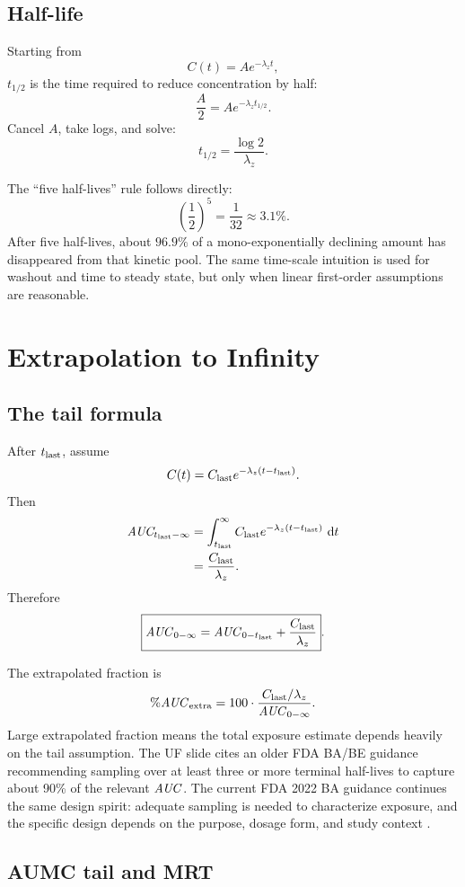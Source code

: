 \documentclass[a4paper]{article}
\newcommand{\AUC}{\ensuremath{\pksym{AUC}}}
\newcommand{\AUClast}{\ensuremath{\pksym{AUC}_{0-t_{\pklab{last}}}}}
\newcommand{\AUCinf}{\ensuremath{\pksym{AUC}_{0-\infty}}}
\newcommand{\Clast}{\ensuremath{C_{\pklab{last}}}}
\newcommand{\Tlast}{\ensuremath{t_{\pklab{last}}}}
\newcommand{\lambdaZ}{\ensuremath{\lambda_z}}
\newcommand{\halfLife}{\ensuremath{t_{1/2}}}
\begin{document}
\subsection{Half-life}

Starting from
\[
  C(t)=Ae^{-\lambdaZ t},
\]
\halfLife{} is the time required to reduce concentration by half:
\[
  \frac{A}{2}=Ae^{-\lambdaZ \halfLife}.
\]
Cancel \(A\), take logs, and solve:
\[
  \halfLife=\frac{\log 2}{\lambdaZ}.
\]

The ``five half-lives'' rule follows directly:
\[
  \left(\frac{1}{2}\right)^5=\frac{1}{32}\approx 3.1\%.
\]
After five half-lives, about \(96.9\%\) of a mono-exponentially declining amount has disappeared from that kinetic pool. The same time-scale intuition is used for washout and time to steady state, but only when linear first-order assumptions are reasonable.

\section{Extrapolation to Infinity}

\subsection{The tail formula}

After \Tlast{}, assume
\[
  C(t)=\Clast e^{-\lambdaZ(t-\Tlast)}.
\]
Then
\[
\begin{aligned}
  \pksym{AUC}_{\Tlast-\infty}
  &=\int_{\Tlast}^{\infty}\Clast e^{-\lambdaZ(t-\Tlast)}\,\dd t\\
  &=\frac{\Clast}{\lambdaZ}.
\end{aligned}
\]
Therefore
\[
  \boxed{
  \AUCinf
  =
  \AUClast+\frac{\Clast}{\lambdaZ}
  }.
\]

The extrapolated fraction is
\[
  \%\pksym{AUC}_{\pklab{extra}}
  =
  100\cdot
  \frac{\Clast/\lambdaZ}{\AUCinf}.
\]
Large extrapolated fraction means the total exposure estimate depends heavily on the tail assumption. The UF slide cites an older FDA BA/BE guidance recommending sampling over at least three or more terminal half-lives to capture about 90\% of the relevant \AUC{}. The current FDA 2022 BA guidance continues the same design spirit: adequate sampling is needed to characterize exposure, and the specific design depends on the purpose, dosage form, and study context \cite{fda2022Bioavailability}.

\subsection{AUMC tail and MRT}
\end{document}
